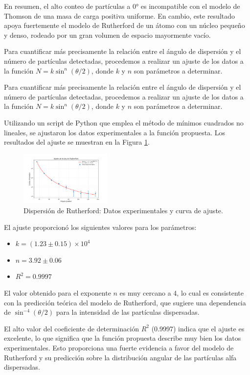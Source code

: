 \documentclass[twocolumn,a4paper,11pt]{scrartcl}
\begin{document}
En resumen, el alto conteo de partículas a 0° es incompatible con el modelo de Thomson de una masa de carga positiva uniforme. En cambio, este resultado apoya fuertemente el modelo de Rutherford de un átomo con un núcleo pequeño y denso, rodeado por un gran volumen de espacio mayormente vacío.

Para cuantificar más precisamente la relación entre el ángulo de dispersión y el número de partículas detectadas, procedemos a realizar un ajuste de los datos a la función $N = k \sin^n (\theta/2)$, donde $k$ y $n$ son parámetros a determinar.

Para cuantificar más precisamente la relación entre el ángulo de dispersión y el número de partículas detectadas, procedemos a realizar un ajuste de los datos a la función $N = k \sin^n (\theta/2)$, donde $k$ y $n$ son parámetros a determinar.

Utilizando un script de Python que emplea el método de mínimos cuadrados no lineales, se ajustaron los datos experimentales a la función propuesta. Los resultados del ajuste se muestran en la Figura \ref{fig:rutherford_fit}.

\begin{figure}[h]
\centering
\includegraphics[width=0.4\textwidth]{data_fit.png}
\caption{Dispersión de Rutherford: Datos experimentales y curva de ajuste.}
\label{fig:rutherford_fit}
\end{figure}

El ajuste proporcionó los siguientes valores para los parámetros:

\begin{itemize}
    \item $k = (1.23 \pm 0.15) \times 10^4$
    \item $n = 3.92 \pm 0.06$
    \item $R^2 = 0.9997$
\end{itemize}

El valor obtenido para el exponente $n$ es muy cercano a 4, lo cual es consistente con la predicción teórica del modelo de Rutherford, que sugiere una dependencia de $\sin^{-4}(\theta/2)$ para la intensidad de las partículas dispersadas.

El alto valor del coeficiente de determinación $R^2$ (0.9997) indica que el ajuste es excelente, lo que significa que la función propuesta describe muy bien los datos experimentales. Esto proporciona una fuerte evidencia a favor del modelo de Rutherford y su predicción sobre la distribución angular de las partículas alfa dispersadas.
\end{document}
